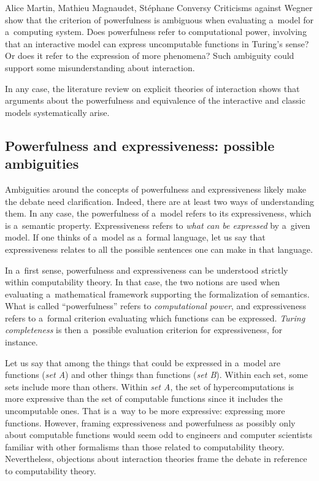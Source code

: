 \begin{artengenv2auth}{Alice Martin, Mathieu Magnaudet, Stéphane Conversy}
Criticisms against Wegner show that the criterion of powerfulness is ambiguous when evaluating a~model for a~computing system. Does powerfulness refer to computational power, involving that an interactive model can express uncomputable functions in Turing’s sense? Or does it refer to the expression of more phenomena? Such ambiguity could support some misunderstanding about interaction.  

In any case, the literature review on explicit theories of interaction shows that arguments about the powerfulness and equivalence of the interactive and classic models systematically arise. 

\subsection{Powerfulness and expressiveness: possible ambiguities}

Ambiguities around the concepts of powerfulness and expressiveness likely make the debate need clarification. Indeed, there are at least two ways of understanding them. 
In any case, the powerfulness of a~model refers to its expressiveness, which is a~semantic property. 
Expressiveness refers to \textit{what can be expressed} by a~given model.
If one thinks of a~model as a~formal language, let us say that expressiveness relates to all the possible sentences one can make in that language. 

In a~first sense, powerfulness and expressiveness can be understood strictly within computability theory.
In that case, the two notions are used when evaluating a~mathematical framework supporting the formalization of semantics. What is called ``powerfulness'' refers to \textit{computational power}, and expressiveness refers to a~formal criterion evaluating which functions can be expressed. \textit{Turing completeness} is then a~possible evaluation criterion for expressiveness, for instance.

Let us say that among the things that could be expressed in a~model are functions (\textit{set A}) and other things than functions (\textit{set B}). Within each set, some sets include more than others.
Within \textit{set A}, the set of hypercomputations is more expressive than the set of computable functions since it includes the uncomputable ones.
That is a~way to be more expressive: expressing more functions. However, framing expressiveness and powerfulness as possibly only about computable functions would seem odd to engineers and computer scientists familiar with other formalisms than those related to computability theory. Nevertheless, objections about interaction theories frame the debate in reference to computability theory.



\end{artengenv2auth}
